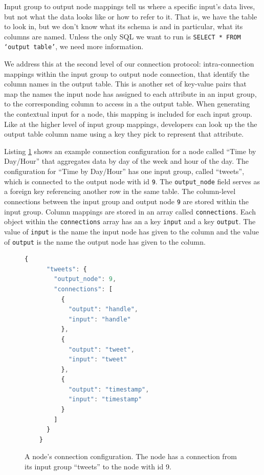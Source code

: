\documentclass[midd]{thesis}
\begin{document}
Input group to output node mappings tell us where a specific input's data lives,
but not what the data looks like or how to refer to it. That is, we have the
table to look in, but we don't know what its schema is and in particular, what
its columns are named. Unless the only SQL we want to run is \texttt{SELECT *
FROM `output table'}, we need more information.

We address this at the second level of our connection protocol: intra-connection
mappings within the input group to output node connection, that identify the
column names in the output table. This is another set of key-value pairs that
map the names the input node has assigned to each attribute in an input group,
to the corresponding column to access in a the output table. When generating the
contextual input for a node, this mapping is included for each input group. Like
at the higher level of input group mappings, developers can look up the the
output table column name using a key they pick to represent that attribute.

Listing \ref{lst:connectionjson} shows an example connection configuration for a
node called ``Time by Day/Hour'' that aggregates data by day of the week and
hour of the day. The configuration for ``Time by Day/Hour'' has one input group,
called ``tweets'', which is connected to the output node with id \texttt{9}. The
\texttt{output\_node} field serves as a foreign key referencing another row in
the same table. The column-level connections between the input group and output
node \texttt{9} are stored within the input group. Column mappings are stored in
an array called \texttt{connections}. Each object within the
\texttt{connections} array has an a key \texttt{input} and a key
\texttt{output}. The value of \texttt{input} is the name the input node has
given to the column and the value of \texttt{output} is the name the output node
has given to the column.

\begin{figure}[!ht]
  \begin{lstlisting}[language=javascript, gobble=4]
    {
      "tweets": {
        "output_node": 9,
        "connections": [
          {
            "output": "handle",
            "input": "handle"
          },
          {
            "output": "tweet",
            "input": "tweet"
          },
          {
            "output": "timestamp",
            "input": "timestamp"
          }
        ]
      }
    }
  \end{lstlisting}
  \caption[The connection configuration for a node.]{A node's connection
  configuration. The node has a connection from its input group ``tweets'' to
  the node with id 9.}
  \label{lst:connectionjson}
\end{figure}
\end{document}
